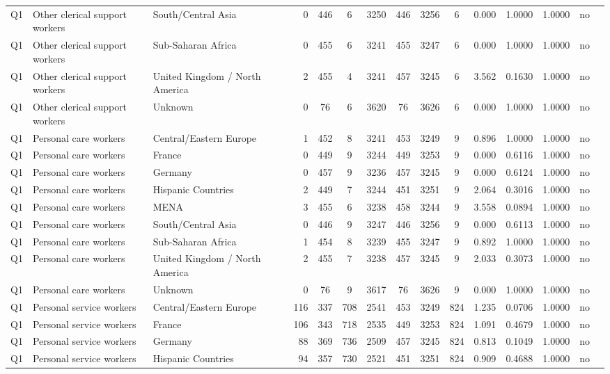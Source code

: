 \begin{longtable}{lllrcccccccccll}
Q1 & Other clerical support workers & South/Central Asia & 0 & 446 & 6 & 3250 & 446 & 3256 & 6 & 0.000 & 1.0000 & 1.0000 & no \\
Q1 & Other clerical support workers & Sub-Saharan Africa & 0 & 455 & 6 & 3241 & 455 & 3247 & 6 & 0.000 & 1.0000 & 1.0000 & no \\
Q1 & Other clerical support workers & United Kingdom / North America & 2 & 455 & 4 & 3241 & 457 & 3245 & 6 & 3.562 & 0.1630 & 1.0000 & no \\
Q1 & Other clerical support workers & Unknown & 0 & 76 & 6 & 3620 & 76 & 3626 & 6 & 0.000 & 1.0000 & 1.0000 & no \\
Q1 & Personal care workers & Central/Eastern Europe & 1 & 452 & 8 & 3241 & 453 & 3249 & 9 & 0.896 & 1.0000 & 1.0000 & no \\
Q1 & Personal care workers & France & 0 & 449 & 9 & 3244 & 449 & 3253 & 9 & 0.000 & 0.6116 & 1.0000 & no \\
Q1 & Personal care workers & Germany & 0 & 457 & 9 & 3236 & 457 & 3245 & 9 & 0.000 & 0.6124 & 1.0000 & no \\
Q1 & Personal care workers & Hispanic Countries & 2 & 449 & 7 & 3244 & 451 & 3251 & 9 & 2.064 & 0.3016 & 1.0000 & no \\
Q1 & Personal care workers & MENA & 3 & 455 & 6 & 3238 & 458 & 3244 & 9 & 3.558 & 0.0894 & 1.0000 & no \\
Q1 & Personal care workers & South/Central Asia & 0 & 446 & 9 & 3247 & 446 & 3256 & 9 & 0.000 & 0.6113 & 1.0000 & no \\
Q1 & Personal care workers & Sub-Saharan Africa & 1 & 454 & 8 & 3239 & 455 & 3247 & 9 & 0.892 & 1.0000 & 1.0000 & no \\
Q1 & Personal care workers & United Kingdom / North America & 2 & 455 & 7 & 3238 & 457 & 3245 & 9 & 2.033 & 0.3073 & 1.0000 & no \\
Q1 & Personal care workers & Unknown & 0 & 76 & 9 & 3617 & 76 & 3626 & 9 & 0.000 & 1.0000 & 1.0000 & no \\
Q1 & Personal service workers & Central/Eastern Europe & 116 & 337 & 708 & 2541 & 453 & 3249 & 824 & 1.235 & 0.0706 & 1.0000 & no \\
Q1 & Personal service workers & France & 106 & 343 & 718 & 2535 & 449 & 3253 & 824 & 1.091 & 0.4679 & 1.0000 & no \\
Q1 & Personal service workers & Germany & 88 & 369 & 736 & 2509 & 457 & 3245 & 824 & 0.813 & 0.1049 & 1.0000 & no \\
Q1 & Personal service workers & Hispanic Countries & 94 & 357 & 730 & 2521 & 451 & 3251 & 824 & 0.909 & 0.4688 & 1.0000 & no \\

\end{longtable}
